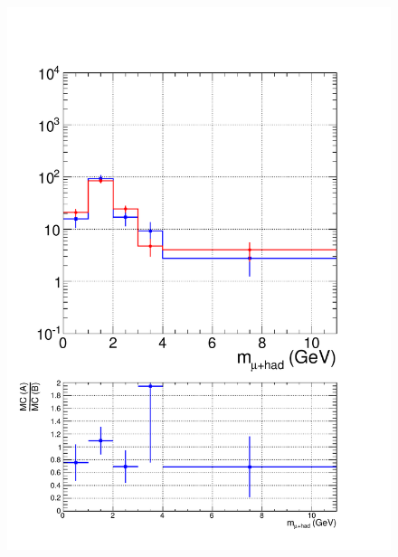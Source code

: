 \begin{figure}[hbtp]
  \begin{center}
    \includegraphics[width=\cmsFigWidth]{figures/MCClosure_highMT_v87}

\end{center}
\end{figure}
